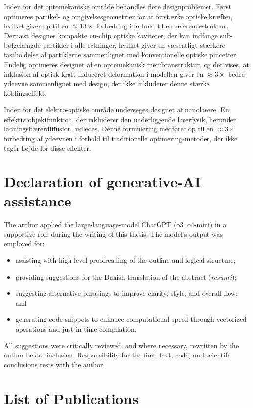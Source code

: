 Inden for det optomekaniske område behandles flere designproblemer. Først optimeres partikel- og omgivelsesgeometrier for at forstærke optiske kræfter, hvilket giver op til en $\approx 13 \times$ forbedring i forhold til en referencestruktur. Dernæst designes kompakte on-chip optiske kaviteter, der kan indfange sub-bølgelængde partikler i alle retninger, hvilket giver en væsentligt stærkere fastholdelse af partiklerne sammenlignet med konventionelle optiske pincetter. Endelig optimeres designet af en optomekanisk membran\-struktur, og det vises, at inklusion af optisk kraft-induceret deformation i modellen giver en $\approx 3 \times$ bedre ydeevne sammenlignet med design, der ikke inkluderer denne stærke koblingseffekt.

Inden for det elektro-optiske område undersøges designet af nanolasere. En effektiv objektfunktion, der inkluderer den underliggende laser\-fy\-sik, herunder ladningsbærerdiffusion, udledes. Denne formulering medfører op til en \mbox{$\approx 3 \times$} forbe\-dring af ydeevnen i forhold til traditionelle optimeringsmetoder, der ikke tager højde for disse effekter.

\cleardoublepage
\chapter*{Declaration of generative-AI assistance}

The author applied the large-language-model ChatGPT (o3, o4-mini) in a supportive role
during the writing of this thesis. The model's output was employed for:
\begin{itemize}
\item assisting with high-level proofreading of the outline and logical structure;
\item providing suggestions for the Danish translation of the abstract (\emph{resumé});
\item suggesting alternative phrasings to improve clarity, style, and overall flow; and
\item generating code snippets to enhance computational speed through vectorized operations and just-in-time compilation.
\end{itemize}
All suggestions were critically reviewed, and where necessary, rewritten by the author before
inclusion. Responsibility for the final text, code, and scientifc conclusions rests with the author.

\cleardoublepage
\chapter*{List of Publications}
\nocite{ownpub0,ownpub1,ownpub3, ownpub2, ownpub4, ownpub5}
\newrefcontext[sorting=none,labelprefix=P]
\printbibliography[env=bibliographyNUM,keyword=myPub,title={List of publications},heading=none,resetnumbers]
\newrefcontext[sorting=none,labelprefix=M]
\printbibliography[env=bibliographyNUM,keyword=myMan,heading=none]

\cleardoublepage

{
  \hypersetup{linkcolor=black}
  \tableofcontents*
}


